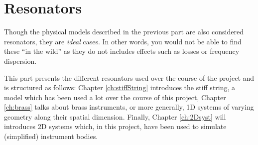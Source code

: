 \chapter*{Resonators}
Though the physical models described in the previous part are also considered resonators, they are \textit{ideal} cases. In other words, you would not be able to find these ``in the wild'' as they do not includes effects such as losses or frequency dispersion. 

This part presents the different resonators used over the course of the project and is structured as follows: Chapter \ref{ch:stiffString} introduces the stiff string, a model which has been used a lot over the course of this project, Chapter \ref{ch:brass} talks about brass instruments, or more generally, 1D systems of varying geometry along their spatial dimension. Finally, Chapter \ref{ch:2Dsyst} will introduces 2D systems which, in this project, have been used to simulate (simplified) instrument bodies.